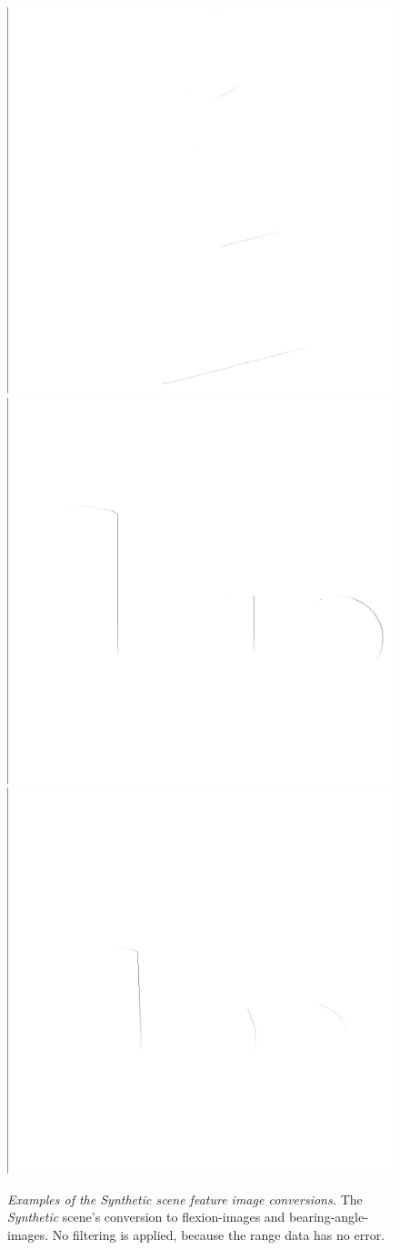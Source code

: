 \begin{figure}[H]
    \includegraphics[width=0.25\linewidth]{chapter06/results/conv_images/synthetic/bearing/raw/0080.png}%
    \includegraphics[width=0.25\linewidth]{chapter06/results/conv_images/synthetic/bearing/raw/0120.png}%
    \includegraphics[width=0.25\linewidth]{chapter06/results/conv_images/synthetic/bearing/raw/0160.png}%
    \caption[Examples of the \emph{Synthetic} scene feature image conversions]{\emph{Examples of the Synthetic scene feature image conversions.} The \emph{Synthetic} scene's conversion to \glspl{flexion-image} and \glspl{bearing-angle-image}. No filtering is applied, because the range data has no error.}
\end{figure}
